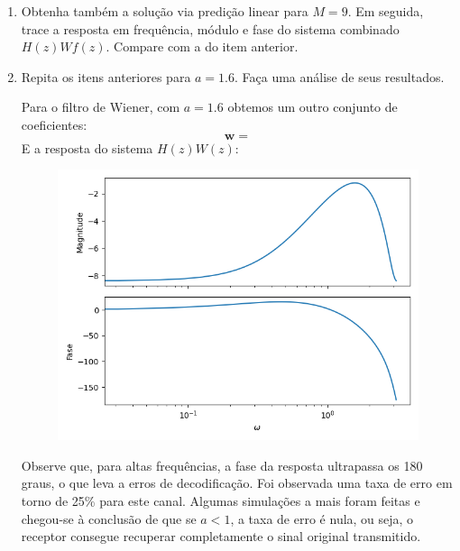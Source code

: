 \begin{enumerate}[label={\bf \roman*:},series=exerc,align=left]
    \item Obtenha também a solução via predição linear para $M = 9$.
    Em seguida, trace a resposta em frequência, módulo e fase do sistema combinado $H(z)Wf(z)$.
    Compare com a do item anterior.

    \item Repita os itens anteriores para $a = 1.6$.
    Faça uma análise de seus resultados.

    Para o filtro de Wiener, com $a=1.6$ obtemos um outro conjunto de coeficientes:
    \begin{equation*} \mathbf{w} =  \end{equation*}
    E a resposta do sistema $H(z)W(z)$:
    \begin{figure}[h!]
        \centering
        \includegraphics{../img/03/Wiener_Bode_1_6.png}
    \end{figure}

    Observe que, para altas frequências, a fase da resposta ultrapassa os 180 graus, o que leva a erros de decodificação.
    Foi observada uma taxa de erro em torno de 25\% para este canal.
    Algumas simulações a mais foram feitas e chegou-se à conclusão de que se $a<1$, a taxa de erro é nula, ou seja, o receptor consegue recuperar completamente o sinal original transmitido.
\end{enumerate}